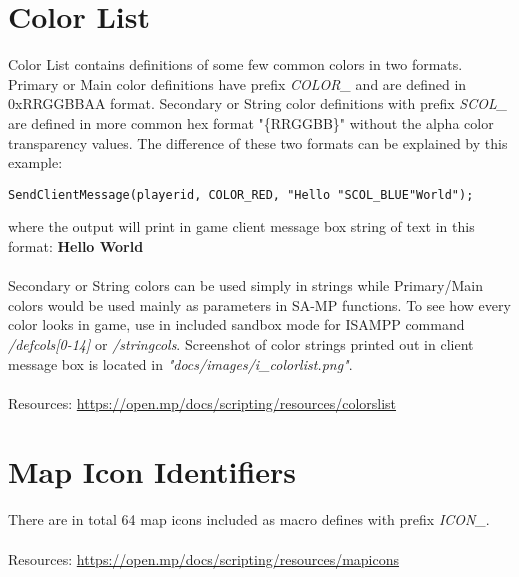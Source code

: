 \documentclass{article}
\begin{document}
\section{Color List}
Color List contains definitions of some few common colors in two formats. Primary or Main color definitions have prefix \textit{COLOR\_} and are defined in 0xRRGGBBAA format. Secondary or String color definitions with prefix \textit{SCOL\_} are defined in more common hex format "\{RRGGBB\}" without the alpha color transparency values. The difference of these two formats can be explained by this example:
\begin{verbatim}
SendClientMessage(playerid, COLOR_RED, "Hello "SCOL_BLUE"World");
\end{verbatim}
where the output will print in game client message box string of text in this format:
\textbf{\color{red}Hello \color{blue}World}\\
\\
Secondary or String colors can be used simply in strings while Primary/Main colors would be used mainly as parameters in SA-MP functions. To see how every color looks in game, use in included sandbox mode for ISAMPP command \textit{/defcols[0-14]} or \textit{/stringcols}. Screenshot of color strings printed out in client message box is located in \textit{"docs/images/i\_colorlist.png"}.
\\
\\Resources: \url{https://open.mp/docs/scripting/resources/colorslist}


\section{Map Icon Identifiers}
There are in total 64 map icons included as macro defines with prefix \textit{ICON\_}.
\\
\\Resources: \url{https://open.mp/docs/scripting/resources/mapicons}
\end{document}
